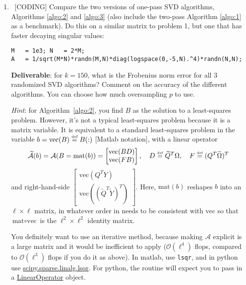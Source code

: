 \documentclass[10pt, letterpaper]{scrartcl}
\begin{document}
\begin{enumerate}[align=left, leftmargin=*, label=\sffamily\bfseries Problem \arabic*:]
    \item \ [CODING] Compare the two versions of one-pass SVD algorithms, Algorithms \ref{algo:2} and \ref{algo:3} (also include the two-pass Algorithm \ref{algo:1} as a benchmark). Do this on a similar matrix to problem 1, but one that has faster decaying singular values:
    
\begin{lstlisting}
M   = 1e3; N   = 2*M;
A   = 1/sqrt(M*N)*randn(M,N)*diag(logspace(0,-5,N).^4)*randn(N,N);
\end{lstlisting}

    \textbf{Deliverable}: for $k=150$, what is the Frobenius norm error for all 3 randomized SVD algorithms? Comment on the accuracy of the different algorithms. You can choose how much oversampling $p$ to use.
    
    \emph{Hint}: for Algorithm~\ref{algo:2}, you find $B$ as the solution to a least-squares problem. However, it's not a typical least-squares problem because it is a matrix variable. It is equivalent to  a standard least-squares problem in the variable $b = \text{vec}(B) \stackrel{\text{\tiny def}}{=} B(:)$ [Matlab notation], with a linear operator 
    $$ \widetilde{\mathcal{A}}(b) = 
    \mathcal{A}(B=\text{mat}(b)) = \begin{bmatrix} \text{vec}(  B D ) \\
    \text{vec}( F B ) \end{bmatrix},
    \quad
    D \stackrel{\text{\tiny def}}{=} \widetilde{Q}^T\Omega, \quad
    F \stackrel{\text{\tiny def}}{=} (Q^T\widetilde{\Omega})^T
    $$ 
    and right-hand-side $\begin{bmatrix}\text{vec}(Q^TY) \\ \text{vec}( (\widetilde{Q}^T\widetilde{Y})^T )\end{bmatrix}$.  Here, $\text{mat}(b)$ reshapes $b$ into an $\ell \times \ell$ matrix, in whatever order in needs to be consistent with $\text{vec}$ so that $\text{mat}\circ\text{vec} $ is the $\ell^2 \times \ell^2$ identity matrix.
    
    You definitely want to use an iterative method, because making $\mathcal{A}$ explicit is a large matrix and it would be inefficient to apply ($\mathcal{O}(\ell^4)$ flops, compared to $\mathcal{O}(\ell^3)$ flops if you do it as above).  In matlab, use \texttt{lsqr}, and in python use \href{https://docs.scipy.org/doc/scipy/reference/generated/scipy.sparse.linalg.lsqr.html}{scipy.sparse.linalg.lsqr}. For python, the routine will expect you to pass in a \href{https://docs.scipy.org/doc/scipy/reference/generated/scipy.sparse.linalg.LinearOperator.html#scipy.sparse.linalg.LinearOperator}{LinearOperator} object. 
    

\end{enumerate}
\end{document}
